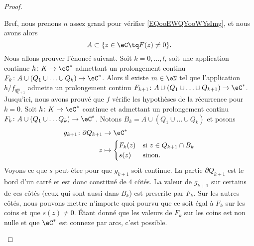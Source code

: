 \begin{proof}
\begin{subproof}
        Bref, nous prenons \( n\) assez grand pour vérifier \eqref{EQooEWQYooWYsImg}, et nous avons alors 
        \begin{equation}
            A\subset \{ z\in \eC\tq F(z)\neq 0 \}.
        \end{equation}
        Nous allons prouver l'énoncé suivant. Soit \( k=0,\ldots, l\), soit une application continue \( h\colon K\to \eC^*\) admettant un prolongement continu \( F_k\colon A\cup(Q_1\cup\ldots\cup Q_k)\to \eC^*\). Alors il existe \( m\in \eN\) tel que l'application \( h/f_{q_{k+1}^m}\) admette un prolongement continu \( F_{k+1}\colon A\cup(Q_1\cup\ldots\cup Q_{k+1})\to \eC^*\).
        Jusqu'ici, nous avons prouvé que \( f\) vérifie les hypothèses de la récurrence pour \( k=0\).
        Soit \( h\colon K\to \eC^*\) continue et admettant un prolongement continu \( F_k\colon A\cup(Q_1\cup\ldots Q_k)\to \eC^*\). Notons \( B_k=A\cup(Q_1\cup\ldots\cup Q_k)\) et posons
        \begin{equation}
            \begin{aligned}
                g_{k+1}\colon \partial Q_{k+1}&\to \eC^* \\
                z&\mapsto \begin{cases}
                    F_k(z)    &   \text{si } z\in Q_{k+1}\cap B_k\\
                    s(z)    &    \text{sinon. }
                \end{cases}
            \end{aligned}
        \end{equation}
        Voyons ce que \( s\) peut être pour que \( g_{k+1}\) soit continue. La partie \( \partial Q_{k+1}\) est le bord d'un carré et est donc constitué de \( 4\) côtés. La valeur de \( g_{k+1}\) sur certains de ces côtés (ceux qui sont aussi dans \( B_k\)) est prescrite par \( F_k\). Sur les autres côtés, nous pouvons mettre n'importe quoi pourvu que ce soit égal à \( F_k\) sur les coins et que \( s(z)\neq 0\). Étant donné que les valeurs de \( F_k\) sur les coins est non nulle et que \( \eC^*\) est connexe par arcs, c'est possible.


\end{subproof}
\end{proof}
